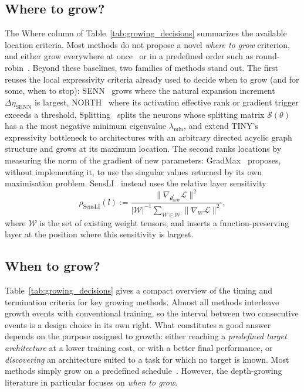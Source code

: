 
\subsection{Where to grow?}
The Where column of Table~\ref{tab:growing_decisions} summarizes the available location criteria. Most methods do not propose a novel \emph{where to grow} criterion, and either grow everywhere at once~\citep{chen_net2net_2016,wei_network_2016,yuan_accelerated_2023,evci_gradmax_2022,dong_towards_2020} or in a predefined order such as round-robin~\citep{verbockhaven_growing_2024,wen_autogrow_2020,wu_when_2024}. Beyond these baselines, two families of methods stand out. The first reuses the local expressivity criteria already used to decide
when to grow (and for some, when to stop): SENN~\citep{mitchell_self-expanding_2024}
grows where the natural expansion increment $\Delta\eta_{\mathrm{SENN}}$ is largest,
 NORTH~\citep{maile_when_2022} where its activation effective rank or gradient trigger
exceeds a threshold, Splitting~\citep{liu_splitting_2019} splits the
neurons whose splitting matrix $\mathcal{S}(\theta)$ has a the most negative minimum eigenvalue $\lambda_{\min}$, and
\citet{douka_growth_2025} extend TINY's expressivity bottleneck to architectures
with an arbitrary directed acyclic graph structure and grows at its maximum location. The second ranks locations
by measuring the norm of the gradient of new parameters: GradMax~\citep{evci_gradmax_2022} proposes,
without implementing it, to use the singular values returned by its
own maximisation problem. SensLI~\citep{kreisSensLISensitivityBasedLayer2026} instead uses the relative layer sensitivity
\begin{equation}\label{eq:sensli_main}
\rho_{\mathrm{SensLI}}(l)
:=
\frac{\|\nabla_{\theta_\mathrm{new}^l}\mathcal L\|^2}
{|\mathcal W|^{-1}\sum_{W\in\mathcal W}\|\nabla_W\mathcal L\|^2},
\end{equation}
where $\mathcal W$ is the set of existing weight tensors, and inserts a function-preserving layer at the position where this sensitivity is largest.

\subsection{When to grow?}

Table~\ref{tab:growing_decisions} gives a compact overview of the timing and termination criteria for key growing methods. Almost all methods interleave growth events with conventional training, so the interval between two consecutive events is a design choice in its own right. What constitutes a good answer depends on the purpose assigned to growth: either reaching a \emph{predefined target architecture} at a lower training cost, or with a better final performance, or \emph{discovering} an architecture suited to a task for which no target is known. Most methods simply grow on a predefined schedule~\citep{chen_net2net_2016,wei_network_2016,evci_gradmax_2022,verbockhaven_growing_2024,yuan_accelerated_2023}. However, the depth-growing literature in particular focuses on \emph{when to grow}.

